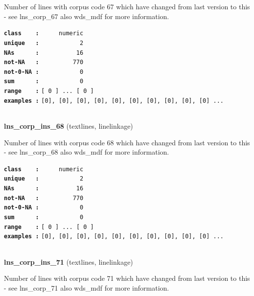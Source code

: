 \documentclass[]{article}
\begin{document}
Number of lines with corpus code 67 which have changed from last version
to this - see lns\_corp\_67 also wds\_mdf for more information.

\textbf{\texttt{class\ \ \ \ :}} \texttt{~~~~~numeric}\\
\textbf{\texttt{unique\ \ \ :}} \texttt{~~~~~~~~~~~2}\\
\textbf{\texttt{NAs\ \ \ \ \ \ :}} \texttt{~~~~~~~~~~16}\\
\textbf{\texttt{not-NA\ \ \ :}} \texttt{~~~~~~~~~770}\\
\textbf{\texttt{not-0-NA\ :}} \texttt{~~~~~~~~~~~0}\\
\textbf{\texttt{sum\ \ \ \ \ \ :}} \texttt{~~~~~~~~~~~0}\\
\textbf{\texttt{range\ \ \ \ :}}
\texttt{{[}\ 0\ {]}\ ...\ {[}\ 0\ {]}}\\
\textbf{\texttt{examples\ :}}
\texttt{{[}0{]},\ {[}0{]},\ {[}0{]},\ {[}0{]},\ {[}0{]},\ {[}0{]},\ {[}0{]},\ {[}0{]},\ {[}0{]},\ {[}0{]}\ ...}\\

~

\textbf{lns\_corp\_ins\_68} (textlines, linelinkage)

Number of lines with corpus code 68 which have changed from last version
to this - see lns\_corp\_68 also wds\_mdf for more information.

\textbf{\texttt{class\ \ \ \ :}} \texttt{~~~~~numeric}\\
\textbf{\texttt{unique\ \ \ :}} \texttt{~~~~~~~~~~~2}\\
\textbf{\texttt{NAs\ \ \ \ \ \ :}} \texttt{~~~~~~~~~~16}\\
\textbf{\texttt{not-NA\ \ \ :}} \texttt{~~~~~~~~~770}\\
\textbf{\texttt{not-0-NA\ :}} \texttt{~~~~~~~~~~~0}\\
\textbf{\texttt{sum\ \ \ \ \ \ :}} \texttt{~~~~~~~~~~~0}\\
\textbf{\texttt{range\ \ \ \ :}}
\texttt{{[}\ 0\ {]}\ ...\ {[}\ 0\ {]}}\\
\textbf{\texttt{examples\ :}}
\texttt{{[}0{]},\ {[}0{]},\ {[}0{]},\ {[}0{]},\ {[}0{]},\ {[}0{]},\ {[}0{]},\ {[}0{]},\ {[}0{]},\ {[}0{]}\ ...}\\

~

\textbf{lns\_corp\_ins\_71} (textlines, linelinkage)

Number of lines with corpus code 71 which have changed from last version
to this - see lns\_corp\_71 also wds\_mdf for more information.
\end{document}
